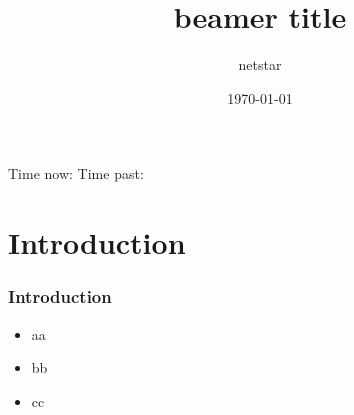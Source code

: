 \documentclass{beamer}
\begin{document}
\title{beamer title}
\author{netstar}
\date[\initclock\mmddyyyy\tddate\ \ \hhmmss\tdtime]{\today}
Time now: \tdtime
Time past: \crono
{}
\maketitle

\section{Introduction}

\begin{frame}
\frametitle{Introduction}
\begin{itemize}
\item aa
\item bb
\item cc
\end{itemize}
\end{frame}
\end{document}
